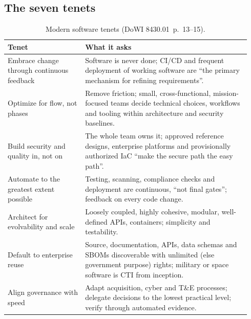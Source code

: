 \documentclass[11pt,letterpaper,twoside,openany]{memoir}
\newcommand{\pg}[2]{{\small(#1~p.~#2)}}          %
\begin{document}
\subsection{The seven tenets}
\begin{longtable}{@{}L{0.30\linewidth}L{0.64\linewidth}@{}}
\caption{Modern software tenets \pg{DoWI 8430.01}{13--15}.}\\
\toprule \sffamily\bfseries Tenet & \sffamily\bfseries What it asks\\ \midrule\endfirsthead
\bottomrule\endfoot
Embrace change through continuous feedback & Software is never done; CI/CD and frequent deployment of working software are ``the primary mechanism for refining requirements''.\\
Optimize for flow, not phases & Remove friction; small, cross-functional, mission-focused teams decide technical choices, workflows and tooling within architecture and security baselines.\\
Build security and quality in, not on & The whole team owns it; approved reference designs, enterprise platforms and provisionally authorized IaC ``make the secure path the easy path''.\\
Automate to the greatest extent possible & Testing, scanning, compliance checks and deployment are continuous, ``not final gates''; feedback on every code change.\\
Architect for evolvability and scale & Loosely coupled, highly cohesive, modular, well-defined APIs, containers; simplicity and testability.\\
Default to enterprise reuse & Source, documentation, APIs, data schemas and SBOMs discoverable with unlimited (else government purpose) rights; military or space software is CTI from inception.\\
Align governance with speed & Adapt acquisition, cyber and T\&E processes; delegate decisions to the lowest practical level; verify through automated evidence.\\
\end{longtable}
\end{document}
